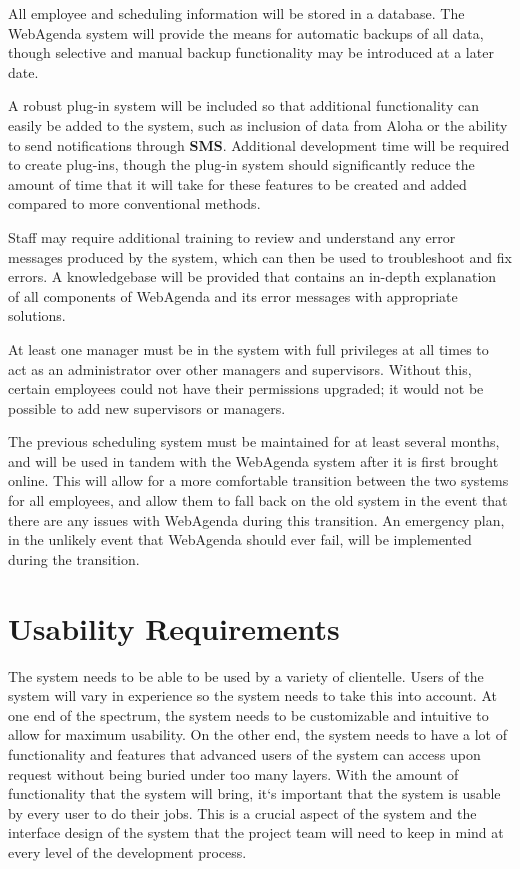 \documentclass[letterpaper,12pt]{report}
\begin{document}
All employee and scheduling information will be stored in a database.  The WebAgenda system will provide the means for automatic backups of all data, though selective and manual backup functionality may be introduced at a later date.

	A robust plug-in system will be included so that additional functionality can easily be added to the system, such as inclusion of data from Aloha or the ability to send notifications through \textbf{SMS}.  Additional development time will be required to create plug-ins, though the plug-in system should significantly reduce the amount of time that it will take for these features to be created and added compared to more conventional methods.

	Staff may require additional training to review and understand any error messages produced by the system, which can then be used to troubleshoot and fix errors.  A knowledgebase will be provided that contains an in-depth explanation of all components of WebAgenda and its error messages with appropriate solutions.

	At least one manager must be in the system with full privileges at all times to act as an administrator over other managers and supervisors.  Without this, certain employees could not have their permissions upgraded; it would not be possible to add new supervisors or managers.

	The previous scheduling system must be maintained for at least several months, and will be used in tandem with the WebAgenda system after it is first brought online.  This will allow for a more comfortable transition between the two systems for all employees, and allow them to fall back on the old system in the event that there are any issues with WebAgenda during this transition. An emergency plan, in the unlikely event that WebAgenda should ever fail, will be implemented during the transition.

\pagebreak
\section{Usability Requirements}
\hspace{1cm}The system needs to be able to be used by a variety of clientelle. Users of the system will vary in experience so the system needs to take this into account. At one end of the spectrum, the system needs to be customizable and intuitive to allow for maximum usability.  On the other end, the system needs to have a lot of functionality and features that advanced users of the system can access upon request without being buried under too many layers.
	With the amount of functionality that the system will bring, it`s important that the system is usable by every user to do their jobs. This is a crucial aspect of the system and the interface design of the system that the project team will need to keep in mind at every level of the development process.
\end{document}
